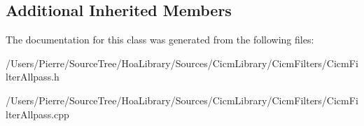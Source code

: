 \subsection*{Additional Inherited Members}


The documentation for this class was generated from the following files\-:\begin{DoxyCompactItemize}
\item 
/\-Users/\-Pierre/\-Source\-Tree/\-Hoa\-Library/\-Sources/\-Cicm\-Library/\-Cicm\-Filters/Cicm\-Filter\-Allpass.\-h\item 
/\-Users/\-Pierre/\-Source\-Tree/\-Hoa\-Library/\-Sources/\-Cicm\-Library/\-Cicm\-Filters/Cicm\-Filter\-Allpass.\-cpp\end{DoxyCompactItemize}
